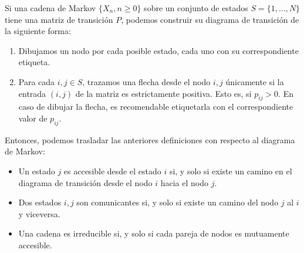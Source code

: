 Si una cadena de Markov $\{X_n,n\geq 0\}$ sobre un conjunto de estados $S=\{1,\dots,N\}$ tiene una matriz de transición $P$, podemos construir su diagrama de transición de la siguiente forma:
\begin{enumerate}
    \item Dibujamos un nodo por cada posible estado, cada uno con su correspondiente etiqueta.
    \item Para cada $i,j\in S$, trazamos una flecha desde el nodo $i,j$ únicamente si la entrada $(i,j)$ de la matriz es estrictamente positiva. Esto es, si $p_{ij}>0$. En caso de dibujar la flecha, es recomendable etiquetarla con el correspondiente valor de $p_{ij}$.
\end{enumerate} 
Entonces, podemos trasladar las anteriores definiciones con respecto al diagrama de Markov:
\begin{itemize}
    \item Un estado $j$ es accesible desde el estado $i$ si, y solo si existe un camino en el diagrama de transición desde el nodo $i$ hacia el nodo $j$.
    \item Dos estados $i,j$ son comunicantes si, y solo si existe un camino del nodo $j$ al $i$ y viceversa.
    \item Una cadena es irreducible si, y solo si cada pareja de nodos es mutuamente accesible.
\end{itemize}

